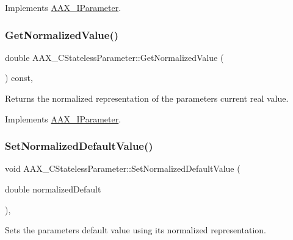 Implements \mbox{\hyperlink{a01857_ad4b9a53e4e972d1a840ef094036e5a70}{A\+A\+X\+\_\+\+I\+Parameter}}.

\mbox{\label{a01541_a24ae82197c173012d1f2b10c6b3456d0}} 
\subsubsection{\texorpdfstring{GetNormalizedValue()}{GetNormalizedValue()}}
{\footnotesize\ttfamily double A\+A\+X\+\_\+\+C\+Stateless\+Parameter\+::\+Get\+Normalized\+Value (\begin{DoxyParamCaption}{ }\end{DoxyParamCaption}) const\hspace{0.3cm}{\ttfamily [inline]}, {\ttfamily [virtual]}}



Returns the normalized representation of the parameter\textquotesingle{}s current real value. 



Implements \mbox{\hyperlink{a01857_a32bc181c17b36fc52736d4d816c56907}{A\+A\+X\+\_\+\+I\+Parameter}}.

\mbox{\label{a01541_a94043d4e33cf8560e3bd22e6503980d3}} 
\subsubsection{\texorpdfstring{SetNormalizedDefaultValue()}{SetNormalizedDefaultValue()}}
{\footnotesize\ttfamily void A\+A\+X\+\_\+\+C\+Stateless\+Parameter\+::\+Set\+Normalized\+Default\+Value (\begin{DoxyParamCaption}\item[{double}]{normalized\+Default }\end{DoxyParamCaption})\hspace{0.3cm}{\ttfamily [inline]}, {\ttfamily [virtual]}}



Sets the parameter\textquotesingle{}s default value using its normalized representation. 



